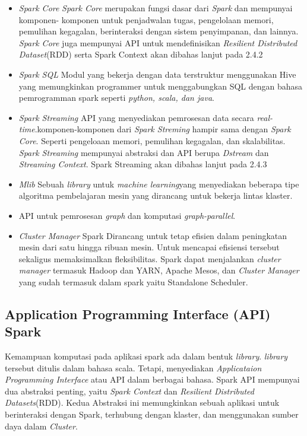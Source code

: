 \begin{itemize}
	\item[]{\textit{Spark Core}\newline
	\textit{Spark Core} merupakan fungsi dasar dari \textit{Spark} dan mempunyai komponen-			
	komponen untuk penjadwalan tugas, pengelolaan memori, pemulihan kegagalan, berinteraksi 		
	dengan sistem penyimpanan, dan lainnya. \textit{Spark Core} juga mempunyai API untuk 			
	mendefinisikan \textit{Resilient Distributed Dataset}(RDD) serta Spark Context akan dibahas 	
	lanjut pada 2.4.2
	}
	
	\item[]{\textit{Spark SQL}\newline
	Modul yang bekerja dengan data terstruktur menggunakan Hive yang memungkinkan programmer 		
	untuk menggabungkan SQL dengan bahasa pemrogramman spark seperti \textit{python, scala, dan 	
	java}.
	}
	
	\item[]{\textit{Spark Streaming}\newline
	API yang menyediakan pemrosesan data secara \textit{real-time}.komponen-komponen 				
	dari \textit{Spark Streming} hampir sama dengan \textit{Spark Core}. Seperti pengeloaan 		
	memori, pemulihan kegagalan, dan skalabilitas. \textit{Spark Streaming} mempunyai abstraksi 	
	dan API berupa \textit{Dstream} dan \textit{Streaming Context}. Spark Streaming akan 			
	dibahas lanjut pada 2.4.3
	}
	
	\item[]{\textit{Mlib}\newline
	Sebuah \textit{library} untuk \textit{machine learning}yang menyediakan beberapa tipe 			
	algoritma pembelajaran mesin yang dirancang untuk bekerja lintas klaster.
	}
	
	\item[] API untuk pemrosesan \textit{graph} dan komputasi \textit{graph-parallel}.
	
	\item[]{\textit{Cluster Manager}\newline
	Spark Dirancang untuk tetap efisien dalam peningkatan mesin dari satu hingga ribuan mesin. 		
	Untuk mencapai efisiensi tersebut sekaligus memaksimalkan fleksibilitas. Spark dapat 			
	menjalankan \textit{cluster manager} termasuk Hadoop dan YARN, Apache Mesos, dan 				
	\textit{Cluster Manager} yang sudah termasuk dalam spark yaitu Standalone Scheduler.
	}
\end{itemize}

\subsection{Application Programming Interface (API) Spark}
Kemampuan komputasi pada aplikasi spark ada dalam bentuk \textit{library}. \textit{library} tersebut ditulis dalam bahasa scala. Tetapi, menyediakan \textit{Applicataion Programming Interface} atau API dalam berbagai bahasa. Spark API mempunyai dua abstraksi penting, yaitu \textit{Spark Context} dan \textit{Resilient Distributed Datasets}(RDD). Kedua Abstraksi ini memungkinkan sebuah aplikasi untuk berinteraksi dengan Spark, terhubung dengan klaster, dan menggunakan sumber daya dalam \textit{Cluster}.

